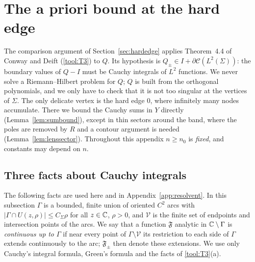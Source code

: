 \providecommand{\eps}{\varepsilon}
\providecommand{\re}{\operatorname{Re}}
\providecommand{\im}{\operatorname{Im}}
\providecommand{\Res}{\operatorname*{Res}}
\providecommand{\thlip}{\vartheta_{\mathrm{lip}}}
\providecommand{\Ob}{\Omega_{\mathrm{b}}}
\providecommand{\Osat}{\Omega^{\triangle}}
\providecommand{\Oinf}{\Omega_{\infty}}
\providecommand{\Cauchy}{\mathcal{C}}
\providecommand{\dC}{\partial\mathcal{C}}

\section{The a priori bound at the hard edge}\label{app:apriori}

The comparison argument of Section~\ref{sec:hardedge} applies Theorem~4.4 of Conway and Deift (\ref{tool:T3}) to $Q$. Its hypothesis is
$Q_\pm\in I+\dC(L^2(\Sigma))$: the boundary values of $Q-I$ must be Cauchy integrals of $L^2$ functions. We never solve a
Riemann--Hilbert problem for $Q$; $Q$ is built from the orthogonal polynomials, and we only have to check that it is not too
singular at the vertices of $\Sigma$. The only delicate vertex is the hard edge $0$, where infinitely many nodes accumulate.
There we bound the Cauchy sums in $Y$ directly (Lemma~\ref{lem:sumbound}), except in thin sectors around the band, where the
poles are removed by $R$ and a contour argument is needed (Lemma~\ref{lem:lenssector}). Throughout this appendix $n\ge n_0$ is
\emph{fixed}, and constants may depend on $n$.

\subsection{Three facts about Cauchy integrals}\label{sec:B-prelim}

The following facts are used here and in Appendix~\ref{app:resolvent}. In this subsection $\Gamma$ is a bounded, finite union of oriented $C^2$ arcs with $|\Gamma\cap U(z,\rho)|\le C_\Sigma\rho$ for all
$z\in\mathbb{C}$, $\rho>0$, and $\mathcal V$ is the finite set of endpoints and intersection points of the arcs. We say that a
function $\mathfrak F$ analytic in $\mathbb{C}\setminus\Gamma$ is \emph{continuous up to $\Gamma$} if near every point of
$\Gamma\setminus\mathcal V$ its restriction to each side of $\Gamma$ extends continuously to the arc; $\mathfrak F_\pm$ then
denote these extensions. We use only Cauchy's integral formula, Green's formula and the facts of \ref{tool:T3}(a).

